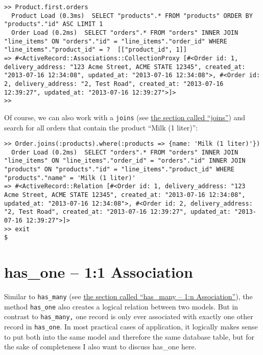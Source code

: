 \documentclass[a4paper]{book}
\newcounter{tab}[chapter]
\begin{document}
\begin{shaded}\begin{verbatim}
>> Product.first.orders
  Product Load (0.3ms)  SELECT "products".* FROM "products" ORDER BY "products"."id" ASC LIMIT 1
  Order Load (0.2ms)  SELECT "orders".* FROM "orders" INNER JOIN "line_items" ON "orders"."id" = "line_items"."order_id" WHERE "line_items"."product_id" = ?  [["product_id", 1]]
=> #<ActiveRecord::Associations::CollectionProxy [#<Order id: 1, delivery_address: "123 Acme Street, ACME STATE 12345", created_at: "2013-07-16 12:34:08", updated_at: "2013-07-16 12:34:08">, #<Order id: 2, delivery_address: "2, Test Road", created_at: "2013-07-16 12:39:27", updated_at: "2013-07-16 12:39:27">]>
>>
\end{verbatim}\end{shaded}

Of course, we can also work with a \texttt{joins} (see \hyperref[activerecordux5f1nux5fjoins]{the section called “joins”}) and search for all orders that contain the product “Milk (1 liter)”:

\begin{shaded}\begin{verbatim}
>> Order.joins(:products).where(:products => {name: 'Milk (1 liter)'})
  Order Load (0.2ms)  SELECT "orders".* FROM "orders" INNER JOIN "line_items" ON "line_items"."order_id" = "orders"."id" INNER JOIN "products" ON "products"."id" = "line_items"."product_id" WHERE "products"."name" = 'Milk (1 liter)'
=> #<ActiveRecord::Relation [#<Order id: 1, delivery_address: "123 Acme Street, ACME STATE 12345", created_at: "2013-07-16 12:34:08", updated_at: "2013-07-16 12:34:08">, #<Order id: 2, delivery_address: "2, Test Road", created_at: "2013-07-16 12:39:27", updated_at: "2013-07-16 12:39:27">]>
>> exit
$
\end{verbatim}\end{shaded}

\section{has\_one -- 1:1 Association}\label{hasux5fone-11-association}

Similar to \texttt{has\_many} (see \hyperref[activerecordux5fhasux5fmany]{the section called “has\_many -- 1:n Association”}), the method \texttt{has\_one} also creates a logical relation between two models. But in contrast to \texttt{has\_many,} one record is only ever associated with exactly one other record in \texttt{has\_one}. In most practical cases of application, it logically makes sense to put both into the same model and therefore the same database table, but for the sake of completeness I also want to discuss has\_one here.
\end{document}

